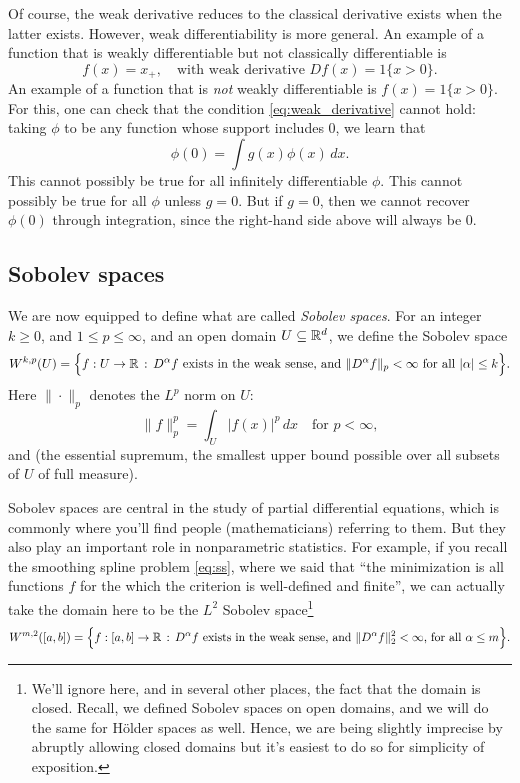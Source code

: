 \documentclass{article}
\DeclareMathOperator*{\esssup}{ess\,sup}
\begin{document}
Of course, the weak derivative reduces to the classical derivative exists when
the latter exists. However, weak differentiability is more general. An example
of a function that is weakly differentiable but not classically differentiable
is
\[
f(x) = x_+, \quad \text{with weak derivative $Df(x) = 1\{x > 0\}$.} 
\]
An example of a function that is \emph{not} weakly differentiable is $f(x) =
1\{x > 0\}$. For this, one can check that the condition
\eqref{eq:weak_derivative} cannot hold: taking $\phi$ to be any function whose
support includes 0, we learn that
\[
\phi(0) = \int g(x) \phi(x) \, dx.
\]
This cannot possibly be true for all infinitely differentiable $\phi$. This
cannot possibly be true for all $\phi$ unless $g=0$. But if $g=0$, then we
cannot recover $\phi(0)$ through integration, since the right-hand side above
will always be 0.   

\subsection{Sobolev spaces}

We are now equipped to define what are called \emph{Sobolev spaces}. For an
integer $k \geq  0$, and $1 \leq p \leq \infty$, and an open domain $U \subseteq 
\mathbb{R}^d$, we define the Sobolev space        
\[
W^{k,p}(U) = \Big\{ f : U \to \mathbb{R} \,:\, \text{$D^\alpha f$ exists in the weak
  sense, and $\|D^\alpha f\|_p < \infty$ for all $|\alpha| \leq k$} \Big\}. 
\]
Here $\|\cdot\|_p$ denotes the $L^p$ norm on $U$: 
\[
\|f\|_p^p = \int_U |f(x)|^p \, dx \quad \text{for $p < \infty$}, 
\]
and \smash{$\|f\|_\infty = \esssup_{x \in U} \, |f(x)|$} (the essential
supremum, the smallest upper bound possible over all subsets of $U$ of full
measure).

Sobolev spaces are central in the study of partial differential equations, which
is commonly where you'll find people (mathematicians) referring to them. But
they also play an important role in nonparametric statistics. For example, if
you recall the smoothing spline problem \eqref{eq:ss}, where we said that ``the
minimization is all functions $f$ for the which the criterion is well-defined
and finite'', we can actually take the domain here to be the $L^2$ Sobolev 
space\footnote{We'll ignore here, and in several other places, the fact that 
  the domain is closed. Recall, we defined Sobolev spaces on open domains, 
  and we will do the same for H{\"o}lder spaces as well. Hence, we are being 
  slightly imprecise by abruptly allowing closed domains but it's easiest to do 
  so for simplicity of exposition.}    
\[
W^{m,2}([a,b]) = \Big\{ f : [a,b] \to \mathbb{R} \,:\, \text{$D^\alpha f$ exists in the
  weak sense, and $\|D^\alpha f\|_2^2 < \infty$, for all $\alpha \leq m$}
\Big\}.     
\]
\end{document}
